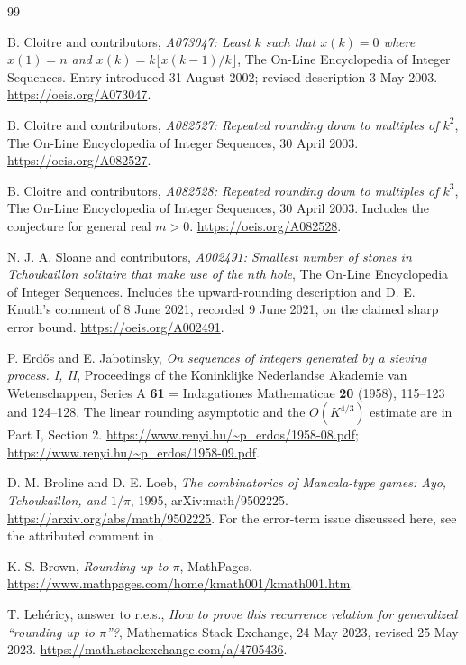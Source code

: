 \begin{thebibliography}{99}
\raggedright
{}

B. Cloitre and contributors,
\emph{A073047: Least $k$ such that $x(k)=0$ where $x(1)=n$ and
$x(k)=k\lfloor x(k-1)/k\rfloor$},
The On-Line Encyclopedia of Integer Sequences.
Entry introduced 31 August 2002; revised description 3 May 2003.
\url{https://oeis.org/A073047}.

B. Cloitre and contributors,
\emph{A082527: Repeated rounding down to multiples of $k^2$},
The On-Line Encyclopedia of Integer Sequences, 30 April 2003.
\url{https://oeis.org/A082527}.

B. Cloitre and contributors,
\emph{A082528: Repeated rounding down to multiples of $k^3$},
The On-Line Encyclopedia of Integer Sequences, 30 April 2003.
Includes the conjecture for general real $m>0$.
\url{https://oeis.org/A082528}.

N. J. A. Sloane and contributors,
\emph{A002491: Smallest number of stones in Tchoukaillon solitaire
that make use of the $n$th hole},
The On-Line Encyclopedia of Integer Sequences.
Includes the upward-rounding description and D. E. Knuth's comment
of 8 June 2021, recorded 9 June 2021, on the claimed sharp error bound.
\url{https://oeis.org/A002491}.

P. Erd\H{o}s and E. Jabotinsky,
\emph{On sequences of integers generated by a sieving process. I, II},
Proceedings of the Koninklijke Nederlandse Akademie van Wetenschappen,
Series A \textbf{61} = Indagationes Mathematicae \textbf{20} (1958),
115--123 and 124--128. The linear rounding asymptotic and the
$O(K^{4/3})$ estimate are in Part I, Section 2.
\url{https://www.renyi.hu/~p_erdos/1958-08.pdf};
\url{https://www.renyi.hu/~p_erdos/1958-09.pdf}.

D. M. Broline and D. E. Loeb,
\emph{The combinatorics of Mancala-type games: Ayo, Tchoukaillon,
and $1/\pi$}, 1995, arXiv:math/9502225.
\url{https://arxiv.org/abs/math/9502225}.
For the error-term issue discussed here, see the attributed comment
in \cite{oeis-threshold}.

K. S. Brown, \emph{Rounding up to $\pi$}, MathPages.
\url{https://www.mathpages.com/home/kmath001/kmath001.htm}.

T. Leh\'ericy,
answer to r.e.s., \emph{How to prove this recurrence relation for
generalized ``rounding up to $\pi$''?}, Mathematics Stack Exchange,
24 May 2023, revised 25 May 2023.
\url{https://math.stackexchange.com/a/4705436}.


\end{thebibliography}
